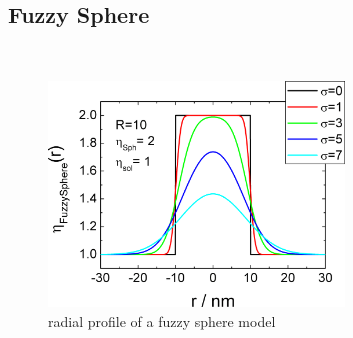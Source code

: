 
\clearpage
\subsection{Fuzzy Sphere}
\label{sect:FuzzySphere} ~\\

\begin{figure}[htb]
\begin{center}
\includegraphics[width=0.7\textwidth,height=0.5\textwidth]{../images/form_factor/FuzzySphere/FuzzySphereProfile.png}
\end{center}
\caption{radial profile of a fuzzy sphere model}
\label{profile:fuzzysphere}
\end{figure}

